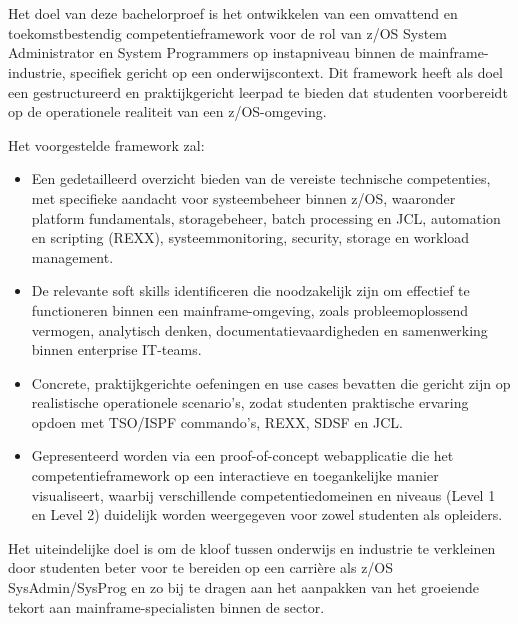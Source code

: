 \section{}%
\label{sec:onderzoeksdoelstelling}
Het doel van deze bachelorproef is het ontwikkelen van een omvattend en toekomstbestendig competentieframework voor de rol van z/OS System Administrator en System Programmers op instapniveau binnen de mainframe-industrie, specifiek gericht op een onderwijscontext. Dit framework heeft als doel een gestructureerd en praktijkgericht leerpad te bieden dat studenten voorbereidt op de operationele realiteit van een z/OS-omgeving.

Het voorgestelde framework zal:
\begin{itemize}
\item Een gedetailleerd overzicht bieden van de vereiste technische competenties, met specifieke aandacht voor systeembeheer binnen z/OS, waaronder platform fundamentals, storagebeheer, batch processing en JCL, automation en scripting (REXX), systeemmonitoring, security, storage en workload management.

\item De relevante soft skills identificeren die noodzakelijk zijn om effectief te functioneren binnen een mainframe-omgeving, zoals probleemoplossend vermogen, analytisch denken, documentatievaardigheden en samenwerking binnen enterprise IT-teams.

\item Concrete, praktijkgerichte oefeningen en use cases bevatten die gericht zijn op realistische operationele scenario’s, zodat studenten praktische ervaring opdoen met TSO/ISPF commando's, REXX, SDSF en JCL.

\item Gepresenteerd worden via een proof-of-concept webapplicatie die het competentieframework op een interactieve en toegankelijke manier visualiseert, waarbij verschillende competentiedomeinen en niveaus (Level 1 en Level 2) duidelijk worden weergegeven voor zowel studenten als opleiders.
\end{itemize}
Het uiteindelijke doel is om de kloof tussen onderwijs en industrie te verkleinen door studenten beter voor te bereiden op een carrière als z/OS SysAdmin/SysProg en zo bij te dragen aan het aanpakken van het groeiende tekort aan mainframe-specialisten binnen de sector.

